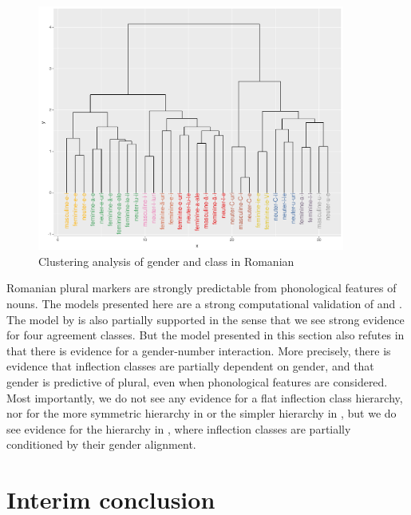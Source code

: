 \begin{figure}
  \centering
  \includegraphics[width=0.9\textwidth]{./figures/romanian/romanian-clust.pdf}
  \caption{Clustering analysis of gender and class in Romanian}\label{fig:romanian-clust-class-2}
\end{figure}

Romanian plural markers are strongly predictable from phonological features of nouns. The models presented here are a strong computational validation of \textcite{Vrabie.1989} and \textcite{Vrabie.2000}. The model by \textcite{Bateman.2010} is also partially supported in the sense that we see strong evidence for four agreement classes. But the model presented in this section also refutes \citeauthor{Bateman.2010} in that there is evidence for a gender-number interaction. More precisely, there is evidence that inflection classes are partially dependent on gender, and that gender is predictive of plural, even when phonological features are considered. Most importantly, we do not see any evidence for a flat inflection class hierarchy, nor for the more symmetric hierarchy in  or the simpler hierarchy in , but we do see evidence for the hierarchy in , where inflection classes are partially conditioned by their gender alignment.


\section{Interim conclusion}

